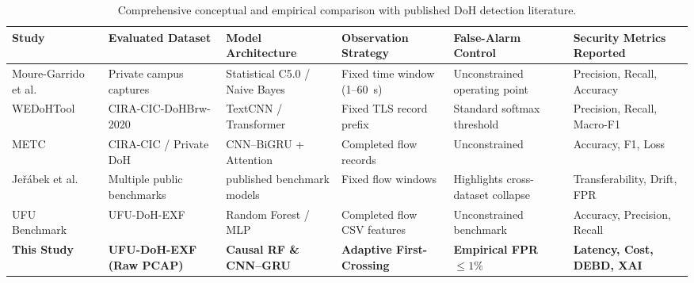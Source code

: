 \documentclass[conference]{IEEEtran}
\begin{document}
\begin{table}[!t]
\centering
\caption{Comprehensive conceptual and empirical comparison with published DoH detection literature.}\label{tab:comparison}
\footnotesize
\setlength{\tabcolsep}{3pt}
\renewcommand{\arraystretch}{1.15}
\begin{tabularx}{\textwidth}{@{}>{\raggedright\arraybackslash}p{}
>{\raggedright\arraybackslash}p{}
>{\raggedright\arraybackslash}p{}
>{\raggedright\arraybackslash}p{}
>{\raggedright\arraybackslash}p{}
>{\raggedright\arraybackslash}X@{}}\toprule
Study & Evaluated Dataset & Model Architecture & Observation Strategy & False-Alarm Control & Security Metrics Reported \\\midrule
Moure-Garrido et al.~\cite{moure} & Private campus captures & Statistical C5.0 / Naive Bayes & Fixed time window (1--60~s) & Unconstrained operating point & Precision, Recall, Accuracy \\
WEDoHTool~\cite{wedoh} & CIRA-CIC-DoHBrw-2020 & TextCNN / Transformer & Fixed TLS record prefix & Standard softmax threshold & Precision, Recall, Macro-F1 \\
METC~\cite{metc} & CIRA-CIC / Private DoH & CNN--BiGRU + Attention & Completed flow records & Unconstrained & Accuracy, F1, Loss \\
Je\v{r}\'abek et al.~\cite{jerabek} & Multiple public benchmarks & 7 published benchmark models & Fixed flow windows & Highlights cross-dataset collapse & Transferability, Drift, FPR \\
UFU Benchmark~\cite{ufu} & UFU-DoH-EXF & Random Forest / MLP & Completed flow CSV features & Unconstrained benchmark & Accuracy, Precision, Recall \\
\textbf{This Study} & \textbf{UFU-DoH-EXF (Raw PCAP)} & \textbf{Causal RF \& CNN--GRU} & \textbf{Adaptive First-Crossing} & \textbf{Empirical FPR $\le 1\%$} & \textbf{Latency, Cost, DEBD, XAI} \\\bottomrule
\end{tabularx}
\end{table}
\end{document}
